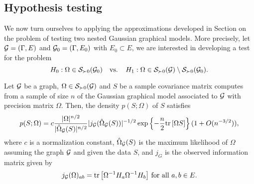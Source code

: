 \subsection{Hypothesis testing}


We now turn ourselves to applying the approximations developed in Section  on the problem of testing two nested Gaussian graphical models. More precisely, let ${\mathcal{G}} = (\Gamma, E)$ and ${\mathcal{G}}_0 = (\Gamma, E_0)$ with $E_0 \subset E$, we are interested in developing a test for the problem
\begin{equation} 
    H_0 : \Omega \in \S_{\succ 0}(\G_0)\ \ \t{ vs. }\ \ H_1 : \Omega \in \S_{\succ 0}(\G) \setminus \S_{\succ 0}(\G_0).
\end{equation}




\begin{lemma} \label{lem-pstar-covariance}
    \cite{eriksen1996tests} Let ${\mathcal{G}}$ be a graph, $\Omega \in {\mathcal{S}}_{\succ 0}({\mathcal{G}})$ and $S$ be a sample covariance matrix computes from a sample of size $n$ of the Gaussian graphical model associated to ${\mathcal{G}}$ with precision matrix $\Omega$. Then, the density $p(S; \Omega)$ of $S$ satisfies
    \begin{equation*}
        p(S; \Omega) = c \frac{|\Omega|^{n/2}}{|\hat\Omega_{\mathcal{G}}(S)|^{n/2}} |j_{\mathcal{G}}(\hat\Omega_{\mathcal{G}}(S)) |^{-1/2} \exp\left\{-\frac{n}{2} {\textrm{tr}\left[\Omega S\right]}\right\} (1 + O(n^{-3/2})),
    \end{equation*}
    where $c$ is a normalization constant, $\hat\Omega_{\mathcal{G}}(S)$ is the maximum likelihood of $\Omega$ assuming the graph ${\mathcal{G}}$ and given the data $S$, and $j_G$ is the observed information matrix given by
    \begin{equation} \label{eq-obs-info}
        j_{\mathcal{G}}(\Omega)_{a b} = {\textrm{tr}\left[\Omega^{-1} H_a \Omega^{-1} H_b\right]} {\textrm{ for all }} a, b  \in E.
    \end{equation}
\end{lemma}

